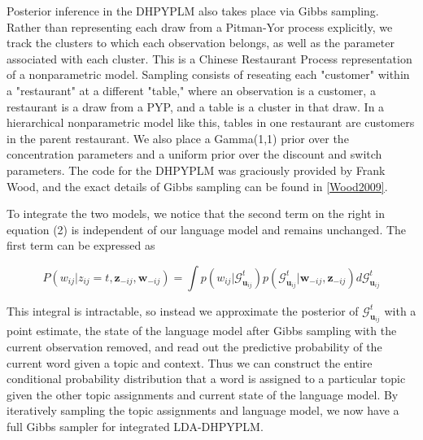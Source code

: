 Posterior inference in the DHPYPLM also takes place via Gibbs sampling.  Rather than representing each draw from a Pitman-Yor process explicitly, we track the clusters to which each observation belongs, as well as the parameter associated with each cluster.  This is a Chinese Restaurant Process representation of a nonparametric model.  Sampling consists of reseating each "customer" within a "restaurant" at a different "table," where an observation is a customer, a restaurant is a draw from a PYP, and a table is a cluster in that draw. In a hierarchical nonparametric model like this, tables in one restaurant are customers in the parent restaurant.  We also place a Gamma(1,1) prior over the concentration parameters and a uniform prior over the discount and switch parameters.  The code for the DHPYPLM was graciously provided by Frank Wood, and the exact details of Gibbs sampling can be found in \ref{Wood2009}.

To integrate the two models, we notice that the second term on the right in equation (2) is independent of our language model and remains unchanged.  The first term can be expressed as

\begin{equation}
P(w_{ij}|z_{ij}=t, \mathbf{z}_{-ij}, \mathbf{w}_{-ij}) = \int p(w_{ij}|\mathcal{G}^t_{\mathbf{u}_{ij}}) p(\mathcal{G}^t_{\mathbf{u}_{ij}}| \mathbf{w}_{-ij}, \mathbf{z}_{-ij}) d\mathcal{G}^t_{\mathbf{u}_{ij}}
\end{equation}

This integral is intractable, so instead we approximate the posterior of $\mathcal{G}^t_{\mathbf{u}_{ij}}$ with a point estimate, the state of the language model after Gibbs sampling with the current observation removed, and read out the predictive probability of the current word given a topic and context.  Thus we can construct the entire conditional probability distribution that a word is assigned to a particular topic given the other topic assignments and current state of the language model.  By iteratively sampling the topic assignments and language model, we now have a full Gibbs sampler for integrated LDA-DHPYPLM.
